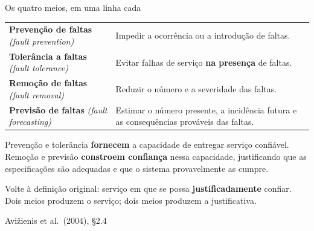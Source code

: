\documentclass{beamer}
\newcommand{\en}[1]{{\color{depCinza}\textit{#1}}}
\newcommand{\sect}[1]{\par\smallskip\hfill{\tiny\color{black!55}Avi\v{z}ienis et al.\ (2004), #1}}
\begin{document}
\begin{frame}{Os quatro meios, em uma linha cada}
    \footnotesize
    \begin{tabularx}{\linewidth}{@{}p{4.2cm} >{\raggedright\arraybackslash}X@{}}
        \toprule
        \textbf{Preven\c{c}\~ao de faltas} \en{(fault prevention)} & Impedir a ocorr\^encia ou a introdu\c{c}\~ao de faltas. \\
        \textbf{Toler\^ancia a faltas} \en{(fault tolerance)} & Evitar falhas de servi\c{c}o \textbf{na presen\c{c}a} de faltas. \\
        \textbf{Remo\c{c}\~ao de faltas} \en{(fault removal)} & Reduzir o n\'umero e a severidade das faltas. \\
        \textbf{Previs\~ao de faltas} \en{(fault forecasting)} & Estimar o n\'umero presente, a incid\^encia futura e as consequ\^encias prov\'aveis das faltas. \\
        \bottomrule
    \end{tabularx}
    \medskip
    \begin{tcolorbox}[colback=depVerde!6,colframe=depVerde!60,boxrule=0.6pt]
        \footnotesize
        Preven\c{c}\~ao e toler\^ancia \textbf{fornecem} a capacidade de entregar servi\c{c}o confi\'avel.\\
        Remo\c{c}\~ao e previs\~ao \textbf{constroem confian\c{c}a} nessa capacidade, justificando que as especifica\c{c}\~oes s\~ao adequadas e que o sistema provavelmente as cumpre.
    \end{tcolorbox}
    \medskip
    \begin{ancora}
        \footnotesize
        Volte \`a defini\c{c}\~ao original: servi\c{c}o em que se possa \textbf{justificadamente} confiar. Dois meios produzem o servi\c{c}o; dois meios produzem a justificativa.
    \end{ancora}
    \sect{\S2.4}
\end{frame}
\end{document}
